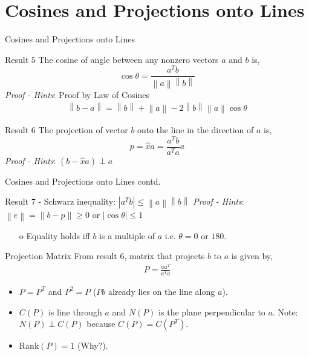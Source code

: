 \documentclass{beamer}
\begin{document}


\section{Cosines and Projections onto Lines}

\begin{frame}{Cosines and Projections onto Lines}
\begin{block}{Result $5$}
The cosine of angle between any nonzero vectors $a$ and $b$ is,
\begin{equation*}
    \cos\theta = \frac{a^Tb}{\left\|a\right\|\left\|b\right\|}
\end{equation*}
\textit{Proof - Hints}: Proof by Law of Cosines
\begin{align*}
    \left\|b-a\right\| = \left\|b\right\| + \left\|a\right\| - 2\left\|b\right\|\left\|a\right\|\cos\theta
\end{align*}
\end{block}
\begin{block}{Result $6$}
The projection of vector $b$ onto the line in the direction of $a$ is,
\begin{equation*}
    p = \hat{x}a = \frac{a^Tb}{a^Ta}a
\end{equation*}
\textit{Proof - Hints}: $(b-\hat{x}a) \perp a$
\end{block}
\end{frame}

\begin{frame}{Cosines and Projections onto Lines contd.}
\begin{block}{Result $7$ - Schwarz inequality: $|a^Tb| \leq \left\|a\right\|\left\|b\right\|$}
\textit{Proof - Hints}: $\left\|e\right\| = \left\|b-p\right\| \geq 0$ or $|\cos\theta| \leq 1$
\begin{itemize}
    \item[o] Equality holds iff $b$ is a multiple of $a$ i.e. $\theta = 0 \text{ or } 180$.
\end{itemize}
\end{block}
\begin{exampleblock}{Projection Matrix}
From result $6$, matrix that projects $b$ to $a$ is given by,
\begin{align*}
    P = \frac{aa^T}{a^Ta}
\end{align*}
\begin{itemize}
    \item $P = P^T$ and $P^2 = P$ ($Pb$ already lies on the line along $a$).
    \item $C(P)$ is line through $a$ and $N(P)$ is the plane perpendicular to $a$. Note: $N(P) \perp C(P)$ because $C(P) = C(P^T)$.
    \item Rank$(P) = 1$ (Why?).
\end{itemize}
\end{exampleblock}
\end{frame}
\end{document}
